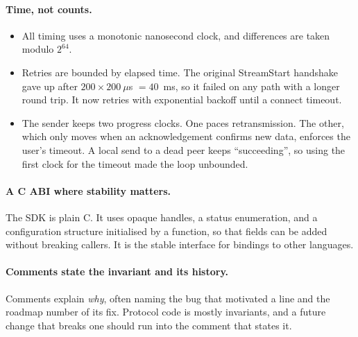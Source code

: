 \paragraph{Time, not counts.}
\begin{itemize}
  \item All timing uses a monotonic nanosecond clock, and differences are taken modulo $2^{64}$.
  \item Retries are bounded by elapsed time. The original StreamStart handshake gave up after
    $200\times200~\mu$s $=40$~ms, so it failed on any path with a longer round trip. It now retries with
    exponential backoff until a connect timeout.
  \item The sender keeps two progress clocks. One paces retransmission. The other, which only moves when an
    acknowledgement confirms new data, enforces the user's timeout. A local send to a dead peer keeps
    ``succeeding'', so using the first clock for the timeout made the loop unbounded.
\end{itemize}

\paragraph{A C ABI where stability matters.} The SDK is plain C. It uses opaque handles, a status enumeration,
and a configuration structure initialised by a function, so that fields can be added without breaking callers.
It is the stable interface for bindings to other languages.

\paragraph{Comments state the invariant and its history.} Comments explain \emph{why}, often naming the bug
that motivated a line and the roadmap number of its fix. Protocol code is mostly invariants, and a future change
that breaks one should run into the comment that states it.
